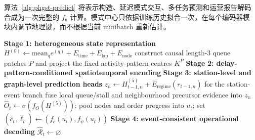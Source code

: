 \documentclass[a4paper,fleqn]{cas-dc}
\newcommand{\zhpara}[1]{%
  \par\begingroup\small\color{black!72}\noindent #1\par\endgroup}
\begin{document}
\zhpara{算法~\ref{alg:phgst-predict} 将表示构造、延迟模式交互、多任务预测和运营报告解码合成为一次完整的 $f_{\theta}$ 计算。模式中心只依据训练历史拟合一次，在每个编码器模块内调节地理键，而不根据当前 minibatch 重新估计。}

\begin{algorithm*}[t]
\SetAlFnt{\small}
\SetAlCapFnt{\small}
\SetAlCapNameFnt{\small\bfseries}
\SetInd{0.6em}{1.0em}
\caption{PHGST-DP delay-aware prediction and operational report generation.}
\label{alg:phgst-predict}
\BlankLine
\textbf{Stage 1: heterogeneous state representation}\;
$H^{(0)}\leftarrow\mathrm{mean}_{q}e^{(q)}+E_{\mathrm{time}}+E_{\mathrm{lap}}+E_{\mathrm{node}}$\;
construct causal length-$3$ queue patches $P$ and project the fixed activity-pattern centres $K^{P}$\;
\BlankLine
\textbf{Stage 2: delay-pattern-conditioned spatiotemporal encoding}\;
\BlankLine
\textbf{Stage 3: station-level and graph-level prediction heads}\;
$z_n\leftarrow H^{(5)}_{t-1,n}+E_{\mathrm{regime}}(r_{t-1,n})$ for the station-event branch\;
fuse local queue/stall and neighbourhood precursor evidence into $z_n$\;
$\hat O_t\leftarrow\sigma(f_O(H^{(5)}))$; pool nodes and order progress into $u_t$; set $(\hat c_t,\hat\ell_t)\leftarrow(f_c(u_t),f_{\psi}(u_t))$\;
\BlankLine
\textbf{Stage 4: event-consistent operational decoding}\;
$\widehat{\mathcal{R}}_t\leftarrow\varnothing$\;
\end{algorithm*}
\end{document}
